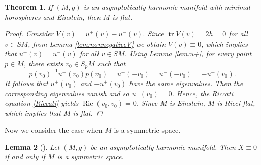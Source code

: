 \documentclass[12pt,a4paper]{amsart}
\newtheorem{Thm}{Theorem}[section]
\newtheorem{Lem}[Thm]{Lemma}
\theoremstyle{definition}
\theoremstyle{remark}
\newcommand{\Ric}{\operatorname{Ric}}
\newcommand{\tr}{\operatorname{tr}}
\newcommand \<{\langle}
\renewcommand \>{\rangle}
\begin{document}
\begin{Thm}\label{thm:asymEin}
    If $(M,g)$ is an asymptotically harmonic manifold with minimal horospheres and Einstein, then $M$ is flat.
\begin{proof}
       Consider $V(v)=u^{+}(v)-u^{-}(v)$. Since $\tr V(v)= 2h = 0$ for all $v\in SM$, from Lemma \ref{lem:nonnegativeV} we obtain $V(v)\equiv 0$, which implies that $u^{+}(v) = u^{-}(v)$ for all $v\in SM$. Using Lemma \ref{lem:u+}, for every point $p\in M$, there exists $v_0\in S_p M$ such that
    \begin{equation*}
        p(v_0)^{-1}u^{+}(v_0)p(v_0) = u^{+}(-v_0)= u^{-}(-v_0)  = -u^{+}(v_0).
    \end{equation*}
    It follows that $u^{+}(v_0)$ and $-u^{+}(v_0)$ have the same eigenvalues. Then the corresponding eigenvalues vanish and so $u^{+}(v_0)=0$. Hence, the Riccati equation \eqref{Riccati} yields $\Ric(v_0,v_0)=0$. Since $M$ is Einstein, $M$ is Ricci-flat, which implies that $M$ is flat.
\end{proof}
\end{Thm}


Now we consider the case when $M$ is {a} symmetric space.

\begin{Lem}[\cite{H}]\label{lem:sym}
    Let $(M,g)$ be an asymptotically harmonic manifold. Then $X\equiv 0$ if and only if $M$ is {a}  symmetric space.
\end{Lem}
\end{document}
